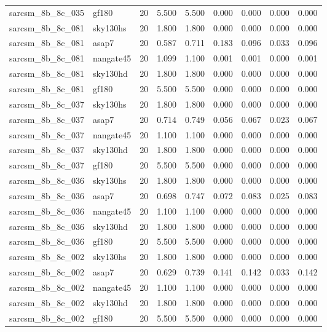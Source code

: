 \begin{tabular}{llrrrrrrr}
sarcsm\_8b\_8c\_035 & gf180 & 20 & 5.500 & 5.500 & 0.000 & 0.000 & 0.000 & 0.000 \\
sarcsm\_8b\_8c\_081 & sky130hs & 20 & 1.800 & 1.800 & 0.000 & 0.000 & 0.000 & 0.000 \\
sarcsm\_8b\_8c\_081 & asap7 & 20 & 0.587 & 0.711 & 0.183 & 0.096 & 0.033 & 0.096 \\
sarcsm\_8b\_8c\_081 & nangate45 & 20 & 1.099 & 1.100 & 0.001 & 0.001 & 0.000 & 0.001 \\
sarcsm\_8b\_8c\_081 & sky130hd & 20 & 1.800 & 1.800 & 0.000 & 0.000 & 0.000 & 0.000 \\
sarcsm\_8b\_8c\_081 & gf180 & 20 & 5.500 & 5.500 & 0.000 & 0.000 & 0.000 & 0.000 \\
sarcsm\_8b\_8c\_037 & sky130hs & 20 & 1.800 & 1.800 & 0.000 & 0.000 & 0.000 & 0.000 \\
sarcsm\_8b\_8c\_037 & asap7 & 20 & 0.714 & 0.749 & 0.056 & 0.067 & 0.023 & 0.067 \\
sarcsm\_8b\_8c\_037 & nangate45 & 20 & 1.100 & 1.100 & 0.000 & 0.000 & 0.000 & 0.000 \\
sarcsm\_8b\_8c\_037 & sky130hd & 20 & 1.800 & 1.800 & 0.000 & 0.000 & 0.000 & 0.000 \\
sarcsm\_8b\_8c\_037 & gf180 & 20 & 5.500 & 5.500 & 0.000 & 0.000 & 0.000 & 0.000 \\
sarcsm\_8b\_8c\_036 & sky130hs & 20 & 1.800 & 1.800 & 0.000 & 0.000 & 0.000 & 0.000 \\
sarcsm\_8b\_8c\_036 & asap7 & 20 & 0.698 & 0.747 & 0.072 & 0.083 & 0.025 & 0.083 \\
sarcsm\_8b\_8c\_036 & nangate45 & 20 & 1.100 & 1.100 & 0.000 & 0.000 & 0.000 & 0.000 \\
sarcsm\_8b\_8c\_036 & sky130hd & 20 & 1.800 & 1.800 & 0.000 & 0.000 & 0.000 & 0.000 \\
sarcsm\_8b\_8c\_036 & gf180 & 20 & 5.500 & 5.500 & 0.000 & 0.000 & 0.000 & 0.000 \\
sarcsm\_8b\_8c\_002 & sky130hs & 20 & 1.800 & 1.800 & 0.000 & 0.000 & 0.000 & 0.000 \\
sarcsm\_8b\_8c\_002 & asap7 & 20 & 0.629 & 0.739 & 0.141 & 0.142 & 0.033 & 0.142 \\
sarcsm\_8b\_8c\_002 & nangate45 & 20 & 1.100 & 1.100 & 0.000 & 0.000 & 0.000 & 0.000 \\
sarcsm\_8b\_8c\_002 & sky130hd & 20 & 1.800 & 1.800 & 0.000 & 0.000 & 0.000 & 0.000 \\
sarcsm\_8b\_8c\_002 & gf180 & 20 & 5.500 & 5.500 & 0.000 & 0.000 & 0.000 & 0.000 \\

\end{tabular}
